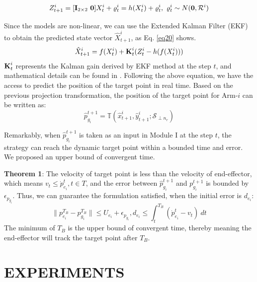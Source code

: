 \documentclass{article}
\begin{document}
\begin{equation}
  \label{eq19}
Z^i_{t+1} = [\textbf{I}_{2\times2}\ \textbf{0}] X^i_t + \varrho^i_t = h (X^i_t) + \varrho^i_t, \ \varrho^i_t \sim N(\textbf 0, \mathcal R^i)
\end{equation}

Since the models are non-linear, we can use the Extended Kalman Filter (EKF) \cite{fujii2013extended} to obtain the predicted state vector $\hat X^i_{t+1}$, as Eq. \eqref{eq20} shows.
\begin{equation}
  \label{eq20}
\hat X^i_{t+1} = f(X^i_t) + \textbf K^i_{t} (Z^i_t - h(f(X^i_t)))
\end{equation}
$\textbf K^i_t$ represents the Kalman gain derived by EKF method at the step $t$, and mathematical details can be found in \cite{fujii2013extended}. Following the above equation, we have the access to predict the position of the target point in real time. Based on the previous projection transformation, the position of the target point for Arm-$i$ can be written as:
\begin{equation}
  \label{eq21}
\hat p_{g_i}^{t+1} =\mathbb T (\hat {x}^i_{t+1}, \hat {y}^i_{t+1};\mathcal S_{\perp n_r})
\end{equation}



Remarkably, when $\hat p_{g_i}^{t+1}$ is taken as an input in Module I at the step $t$, the strategy can reach the dynamic target point within a bounded time and error. We proposed an upper bound of convergent time.


\textbf{Theorem 1}: The velocity of target point is less than the velocity of end-effector, which means $v_t \leq \dot p^t_{e_i}, t \in T $, and the error between $\hat p_{g_i}^{t+1}$ and $p_{g_i}^{t+1}$ is bounded by $\epsilon_{p_{g_i}} $. Thus, we can guarantee the formulation satisfied, when the initial error is $ d_{e_i}$: 
\begin{equation}
  \label{eq22}
\| p^{T_B}_{e_i}-p^{T_B}_{g_i} \| \leq U_{e_i}+\epsilon_{p_{g_i}} ,  d_{e_i} \leq \int^{T_B}_{t} (\dot p^t_{e_i} - v_t) \ dt
\end{equation}
The minimum of $T_B$ is the upper bound of convergent time, thereby meaning the end-effector will track the target point after $T_B$. 








\section{EXPERIMENTS}
\end{document}

